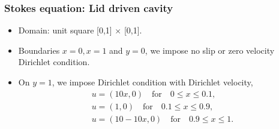 \documentclass{beamer}
\begin{document}
\begin{frame}
{\begin{minipage}[t]{0.48\linewidth}
\end{minipage}}
\hfill
{}
\end{frame}
\begin{frame}
\frametitle{Stokes equation: Lid driven cavity}
\begin{itemize}
\item Domain: unit square [0,1] $\times$ [0,1].
\item Boundaries ${x = 0}, {x = 1}$ and ${y = 0}$, we impose no slip or zero velocity Dirichlet condition. 
\item On ${y = 1}$, we impose Dirichlet condition with Dirichlet velocity,
\begin{equation}
\begin{split}
u = (10x,0) \quad \textrm{for} \quad 0 \leq x \leq 0.1 \textrm{,}\\
u = (1,0) \quad \textrm{for} \quad 0.1 \leq x \leq 0.9 \textrm{,}\\
u = (10 - 10x,0) \quad \textrm{for} \quad 0.9 \leq x \leq 1 \textrm{.}
\end{split}
\end{equation}
\end{itemize}
\end{frame}
\end{document}
